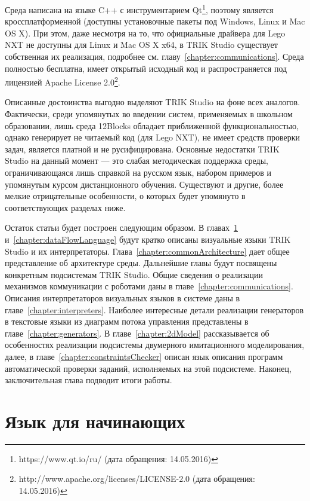 \documentclass[a5paper]{article}
\begin{document}
Среда написана на языке C++ с инструментарием Qt\footnote{https://www.qt.io/ru/ (дата обращения: 14.05.2016)}, поэтому является кроссплатформенной (доступны установочные пакеты под Windows, Linux и Mac OS X). При этом, даже несмотря на то, что официальные драйвера для Lego NXT не доступны для Linux и Mac OS X x64, в TRIK Studio существует собственная их реализация, подробнее см. главу~\ref{chapter:communications}. Среда полностью бесплатна, имеет открытый исходный код и распространяется под лицензией Apache License 2.0\footnote{http://www.apache.org/licenses/LICENSE-2.0 (дата обращения: 14.05.2016)}.

Описанные достоинства выгодно выделяют TRIK Studio на фоне всех аналогов. Фактически, среди упомянутых во введении систем, применяемых в школьном образовании, лишь среда 12Blocks обладает приближенной функциональностью, однако генерирует не читаемый код (для Lego NXT), не имеет средств проверки задач, является платной и не русифицирована. Основные недостатки TRIK Studio на данный момент --- это слабая методическая поддержка среды, ограничивающаяся лишь справкой на русском язык, набором примеров и упомянутым курсом дистанционного обучения. Существуют и другие, более мелкие отрицательные особенности, о которых будет упомянуто в соответствующих разделах ниже.

Остаток статьи будет построен следующим образом. В главах~\ref{chapter:controlFlowLanguage} и~\ref{chapter:dataFlowLanguage} будут кратко описаны визуальные языки TRIK Studio и их интерпретаторы. Глава~\ref{chapter:commonArchitecture} дает общее представление об архитектуре среды. Дальнейшие главы будут посвящены конкретным подсистемам TRIK Studio. Общие сведения о реализации механизмов коммуникации с роботами даны в главе~\ref{chapter:communications}. Описания интерпретаторов визуальных языков в системе даны в главе~\ref{chapter:interpreters}. Наиболее интересные детали реализации генераторов в текстовые языки из диаграмм потока управления представлены в главе~\ref{chapter:generators}. В главе~\ref{chapter:2dModel} рассказывается об особенностях реализации подсистемы двумерного имитационного моделирования, далее, в главе~\ref{chapter:constraintsChecker} описан язык описания программ автоматической проверки заданий, исполняемых на этой подсистеме. Наконец, заключительная глава подводит итоги работы.

\section{Язык для начинающих}
\label{chapter:controlFlowLanguage}
\end{document}
